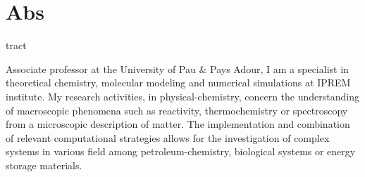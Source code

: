 \documentclass{cv-style}     %
\begin{document}
\vspace{0mm}
\section{Abs}{tract}
\vspace{-0.2cm}


Associate professor at the University of Pau \& Pays Adour, I am a specialist in
theoretical chemistry, molecular modeling and numerical simulations at IPREM institute.
My research activities, in physical-chemistry, concern the understanding 
of macroscopic phenomena such as reactivity, thermochemistry or spectroscopy from
a microscopic description of matter. The implementation and combination of relevant computational
strategies allows for the investigation of complex systems in various field among
petroleum-chemistry, biological systems or energy storage materials.






\end{document}
